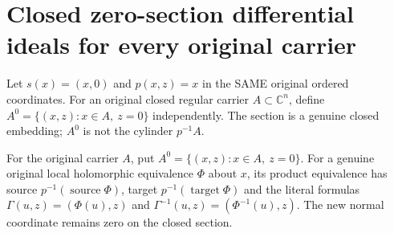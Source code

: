 \section{Closed zero-section differential ideals for every original carrier}

Let $s(x)=(x,0)$ and $p(x,z)=x$ in the SAME original ordered coordinates. For an original closed regular carrier $A\subset\mathbb C^n$, define $A^0=\{(x,z):x\in A,\ z=0\}$ independently. The section is a genuine closed embedding; $A^0$ is not the cylinder $p^{-1}A$.

\begin{definition}
\label{hir:actual-zero-section-submanifold-lift}
\leanok
For the original carrier $A$, put $A^0=\{(x,z):x\in A,\ z=0\}$. For a genuine original local holomorphic equivalence $\Phi$ about $x$, its product equivalence has source $p^{-1}(\operatorname{source}\Phi)$, target $p^{-1}(\operatorname{target}\Phi)$ and the literal formulas $\Gamma(u,z)=(\Phi(u),z)$ and $\Gamma^{-1}(u,z)=(\Phi^{-1}(u),z)$. The new normal coordinate remains zero on the closed section.
\end{definition}

